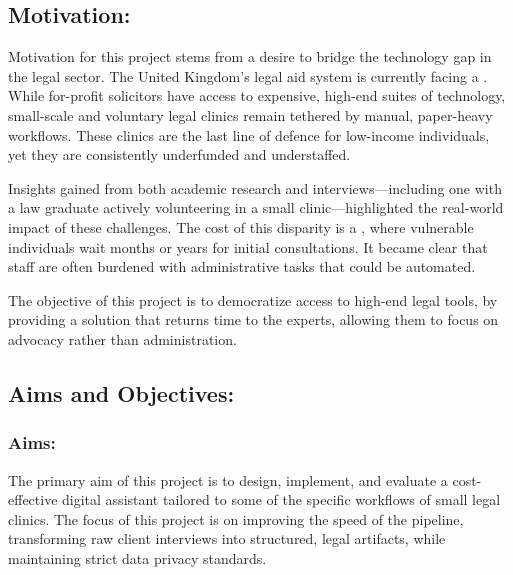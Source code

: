 \documentclass[11pt,a4paper]{article}
\begin{document}
\subsection{Motivation:}

Motivation for this project stems from a desire to bridge the technology gap in the legal sector. The United Kingdom's legal aid system is currently facing a . While for-profit solicitors have access to expensive, high-end suites of technology, small-scale and voluntary legal clinics remain tethered by manual, paper-heavy workflows. These clinics are the last line of defence for low-income individuals, yet they are consistently underfunded and understaffed. \par

Insights gained from both academic research and interviews—including one with a law graduate actively volunteering in a small clinic—highlighted the real-world impact of these challenges. The cost of this disparity is a , where vulnerable individuals wait months or years for initial consultations. It became clear that staff are often burdened with administrative tasks that could be automated. \par

The objective of this project is to democratize access to high-end legal tools, by providing a solution that returns time to the experts, allowing them to focus on advocacy rather than administration.

\subsection{Aims and Objectives:}

\subsubsection{Aims:}
The primary aim of this project is to design, implement, and evaluate a cost-effective digital assistant tailored to some of the specific workflows of small legal clinics. The focus of this project is on improving the speed of the  pipeline, transforming raw client interviews into structured, legal artifacts, while maintaining strict data privacy standards.
\end{document}
